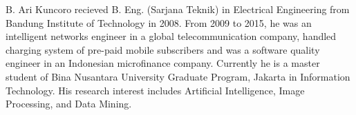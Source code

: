 \documentclass[conference]{IEEEtran}
\begin{document}




% 

\begin{IEEEbiographynophoto}{B. Ari Kuncoro}
recieved B. Eng. (Sarjana Teknik) in Electrical Engineering from Bandung Institute of Technology in 2008. From 2009 to 2015, he was an intelligent networks engineer in a global telecommunication company, handled charging system of pre-paid mobile subscribers and was a software quality engineer in an Indonesian microfinance company. Currently he is a master student of Bina Nusantara University Graduate Program, Jakarta in Information Technology. His research interest includes Artificial Intelligence, Image Processing, and Data Mining. 
\end{IEEEbiographynophoto}











\end{document}
